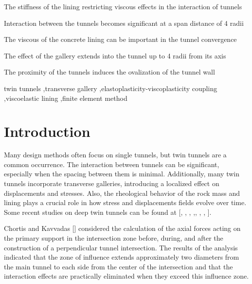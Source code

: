 \documentclass[a4paper,fleqn]{cas-sc}
\begin{document}
\begin{highlights}
	\item The stiffness of the lining restricting viscous effects in the interaction of tunnels
	\item Interaction between the tunnels becomes significant at a span distance of 4 radii
	\item The viscous of the concrete lining can be important in the tunnel convergence
	\item The effect of the gallery extends into the tunnel up to 4 radii from its axis
	\item The proximity of the tunnels induces the ovalization of the tunnel wall 
\end{highlights}

\begin{keywords}
twin tunnels \sep transverse gallery \sep elastoplasticity-viscoplasticity coupling
\sep viscoelastic lining \sep finite element method
\end{keywords}

\maketitle

\section{Introduction}\label{}

Many design methods often focus on single tunnels, but twin tunnels are a common occurrence. The interaction between tunnels can be significant, especially when the spacing between them is minimal. Additionally, many twin tunnels incorporate transverse galleries, introducing a localized effect on displacements and stresses. Also, the rheological behavior of the rock mass and lining plays a crucial role in how stress and displacements fields evolve over time. Some recent studies on deep twin tunnels can be found at [, , , ,, , , ].

Chortis and Kavvadas [] considered the calculation of the axial forces acting on the primary support in the intersection zone before, during, and after the construction of a perpendicular tunnel intersection. The results of the analysis indicated that the zone of influence extends approximately two diameters from the main tunnel to each side from the center of the intersection and that the interaction effects are practically eliminated when they exceed this influence zone. 
\end{document}
